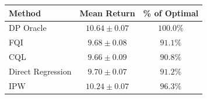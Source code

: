 \begin{tabular}{lcc}
\hline
Method & Mean Return & \% of Optimal \\
\hline
DP Oracle & $10.64 \pm 0.07$ & $100.0\%$ \\
FQI & $9.68 \pm 0.08$ & $91.1\%$ \\
CQL & $9.66 \pm 0.09$ & $90.8\%$ \\
Direct Regression & $9.70 \pm 0.07$ & $91.2\%$ \\
IPW & $10.24 \pm 0.07$ & $96.3\%$ \\
\hline
\end{tabular}
